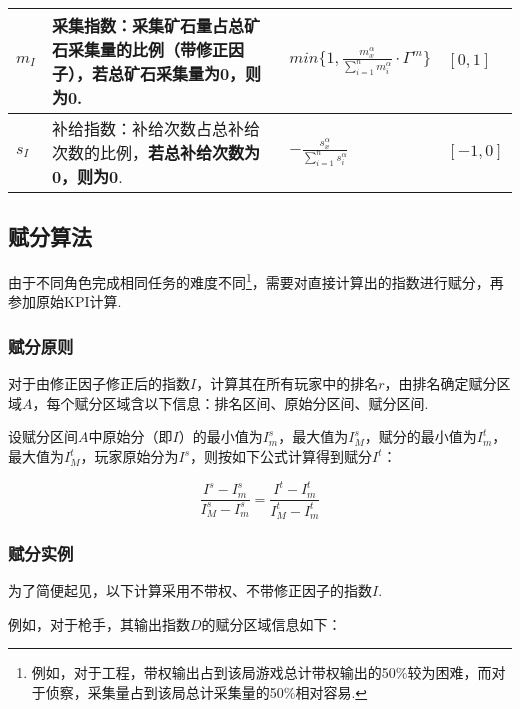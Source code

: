 \documentclass{ctexart}
\begin{document}
\begin{longtable}{|>{\centering\arraybackslash}p{4em}|>{\centering\arraybackslash}p{14em}|>{\centering\arraybackslash}p{10em}|>{\centering\arraybackslash}p{4em}|}
    \hline

    $m_I$        & 采集指数：采集矿石量占总矿石采集量的比例（带修正因子），\textbf{若总矿石采集量为0，则为0}. & $min\{1, \frac{m_x^\alpha}{\sum_{i = 1}^{n} m_i^\alpha} \cdot \Gamma^m\}$ & $[0, 1]$                \\

    \hline

    $s_I$        & 补给指数：补给次数占总补给次数的比例，\textbf{若总补给次数为0，则为0}.           & $-\frac{s_x^\alpha}{\sum_{i = 1}^{n} s_i^\alpha}$                         & $[-1, 0]$               \\

    \hline
\end{longtable}


\subsection{赋分算法}

由于不同角色完成相同任务的难度不同\footnote{例如，对于工程，带权输出占到该局游戏总计带权输出的50\%较为困难，而对于侦察，采集量占到该局总计采集量的50\%相对容易.}，需要对直接计算出的指数进行赋分，再参加原始KPI计算.

\subsubsection{赋分原则}

对于由修正因子修正后的指数$I$，计算其在所有玩家中的排名$r$，由排名确定赋分区域$A$，每个赋分区域含以下信息：排名区间、原始分区间、赋分区间.

设赋分区间$A$中原始分（即$I$）的最小值为$I_{m}^s$，最大值为$I_{M}^s$，赋分的最小值为$I_{m}^t$，最大值为$I_{M}^t$，玩家原始分为$I^s$，则按如下公式计算得到赋分$I^t$：

\begin{equation}
    \frac{I^s - I_{m}^s}{I_{M}^s - I_{m}^s} = \frac{I^t - I_{m}^t}{I_{M}^t - I_{m}^t}
\end{equation}

\subsubsection{赋分实例}

为了简便起见，以下计算采用不带权、不带修正因子的指数$I$.

例如，对于枪手，其输出指数$D$的赋分区域信息如下：
\end{document}
